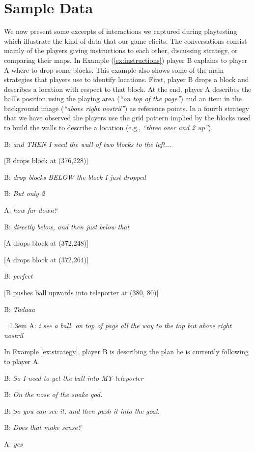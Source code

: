 \section{Sample Data}

We now present some excerpts of interactions we captured during
playtesting which illustrate the kind of data that our game
elicits.  The conversations consist mainly of the players giving
instructions to each other, discussing strategy, or comparing their
maps. In Example (\ref{ex:instructions}) player B explains to player A
where to drop some blocks. This example also shows some of the main
strategies that players use to identify locations. First, player B
drops a block and describes a location with respect to that block. At
the end, player A describes the ball's position using the playing area
(\textit{``on top of the page''}) and an item in the background image
(\textit{``above right nostril''}) as reference points. In a fourth
strategy that we have observed the players use the grid pattern implied
by the blocks used to build the walls to
describe a location (e.g., \textit{``three over and 2 up''}).

{\footnotesize
\begin{example}
\parbox[t]{0.9\columnwidth}{
B: \textit{and THEN I need the wall of two blocks to the left...}

\strut[B drops block at (376,228)]

B: \textit{drop blocks BELOW the block I just dropped}

B: \textit{But only 2}

A: \textit{how far down?}

B: \textit{directly below, and then just below that}

\strut[A drops block at (372,248)]
\strut[A drops block at (372,264)]

B: \textit{perfect}

\strut[B pushes ball upwards into teleporter at (380, 80)]

B: \textit{Tadaaa}

\hangindent=1.3em A: \textit{i see a ball.  on top of page all the way to the top but
  above right nostril}
}
\label{ex:instructions}
\end{example}
}

In Example \ref{ex:strategy}, player B is describing the plan he is
currently following to player A.


{\footnotesize
\begin{example}
\parbox[t]{0.9\columnwidth}{
B: \textit{So I need to get the ball into MY teleporter}

B: \textit{On the nose of the snake god.}

B: \textit{So you can see it, and then push it into the goal.}

B: \textit{Does that make sense?}

A: \textit{yes}
}
\label{ex:strategy}
\end{example}
}

